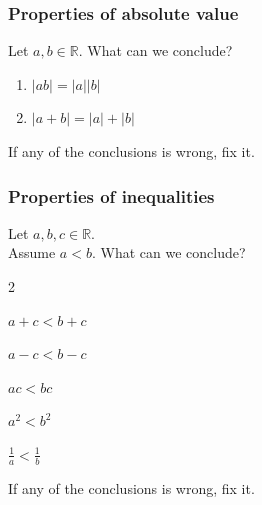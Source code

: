 \documentclass[14pt]{beamer}
\date{}
\title{}
\author{}
\begin{document}


	\begin{frame}
		\frametitle{Properties of absolute value}

		Let $a, b \in \mathbb{R}$. What can we conclude?

		\begin{enumerate}
			\item $\displaystyle |ab| = |a| |b|$

			\item $\displaystyle |a + b | = |a| + |b|$
		\end{enumerate}

		If any of the conclusions is wrong, fix it.
	\end{frame}


	\begin{frame}
		\frametitle{Properties of inequalities}

		Let $a, b, c \in \mathbb{R}$. \\ Assume $a < b$. What can we conclude?

		\begin{enumerate}
		\end{enumerate}

		If any of the conclusions is wrong, fix it.
	\end{frame}

\end{document}
